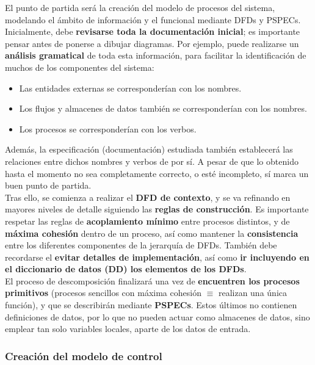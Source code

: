 El punto de partida será la creación del modelo de procesos del sistema, modelando el ámbito de información y el funcional mediante DFDs y PSPECs.\\

Inicialmente, debe \textbf{revisarse toda la documentación inicial}; es importante pensar antes de ponerse a dibujar diagramas. Por ejemplo, puede realizarse un \textbf{análisis gramatical} de toda esta información, para facilitar la identificación de muchos de los componentes del sistema:

\begin{itemize}
    \item Las entidades externas se corresponderían con los nombres.
    \item Los flujos y almacenes de datos también se corresponderían con los nombres.
    \item Los procesos se corresponderían con los verbos.
\end{itemize}

Además, la especificación (documentación) estudiada también establecerá las relaciones entre dichos nombres y verbos de por sí. A pesar de que lo obtenido hasta el momento no sea completamente correcto, o esté incompleto, sí marca un buen punto de partida.\\

Tras ello, se comienza a realizar el \textbf{DFD de contexto}, y se va refinando en mayores niveles de detalle siguiendo las \textbf{reglas de construcción}. Es importante respetar las reglas de \textbf{acoplamiento mínimo} entre procesos distintos, y de \textbf{máxima cohesión} dentro de un proceso, así como mantener la \textbf{consistencia} entre los diferentes componentes de la jerarquía de DFDs. También debe recordarse el \textbf{evitar detalles de implementación}, así como \textbf{ir incluyendo en el diccionario de datos (DD) los elementos de los DFDs}.\\

El proceso de descomposición finalizará una vez de \textbf{encuentren los procesos primitivos} (procesos sencillos con máxima cohesión $\equiv$ realizan una única función), y que se describirán mediante \textbf{PSPECs}. Estos últimos no contienen definiciones de datos, por lo que no pueden actuar como almacenes de datos, sino emplear tan solo variables locales, aparte de los datos de entrada.

\subsubsection{Creación del modelo de control}

